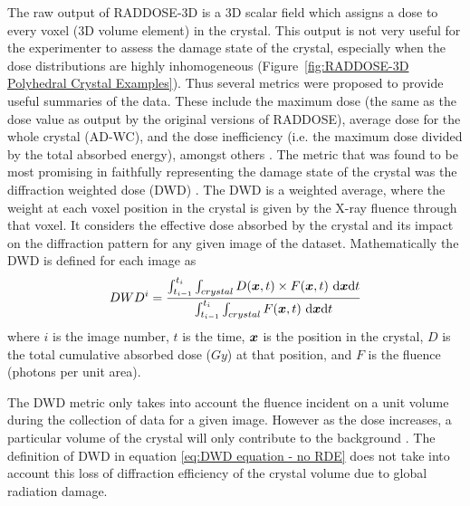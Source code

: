         The raw output of RADDOSE-3D is a 3D scalar field which assigns a dose to every voxel (3D volume element) in the crystal.
        This output is not very useful for the experimenter to assess the damage state of the crystal, especially when the dose distributions are highly inhomogeneous (Figure~\ref{fig:RADDOSE-3D Polyhedral Crystal Examples}).
        Thus several metrics were proposed to provide useful summaries of the data.
        These include the maximum dose (the same as the dose value as output by the original versions of RADDOSE), average dose for the whole crystal (AD-WC), and the dose inefficiency (i.e. the maximum dose divided by the total absorbed energy), amongst others \cite{zeldin2012}.
        The metric that was found to be most promising in faithfully representing the damage state of the crystal was the diffraction weighted dose (DWD) \cite{zeldin2013dwd}.
        The DWD is a weighted average, where the weight at each voxel position in the crystal is given by the X-ray fluence through that voxel.
        It considers the effective dose absorbed by the crystal and its impact on the diffraction pattern for any given image of the dataset.
        Mathematically the DWD is defined for each image as
        \begin{equation}
            DWD^i = \f{\int_{t_{i-1}}^{t_i} \int_{crystal} D(\bs{x},t) \times F(\bs{x},t)\ \mathrm{d}\bs{x}\mathrm{d}t}{\int_{t_{i-1}}^{t_i} \int_{crystal} F(\bs{x},t)\ \mathrm{d}\bs{x}\mathrm{d}t}
            \label{eq:DWD equation - no RDE}
        \end{equation}
        where $i$ is the image number, $t$ is the time, $\boldsymbol{x}$ is the position in the crystal, $D$ is the total cumulative absorbed dose ($Gy$) at that position, and $F$ is the fluence (photons per unit area).

        The DWD metric only takes into account the fluence incident on a unit volume during the collection of data for a given image.
        However as the dose increases, a particular volume of the crystal will only contribute to the background \cite{blake1962}.
        The definition of DWD in equation \ref{eq:DWD equation - no RDE} does not take into account this loss of diffraction efficiency of the crystal volume due to global radiation damage.

